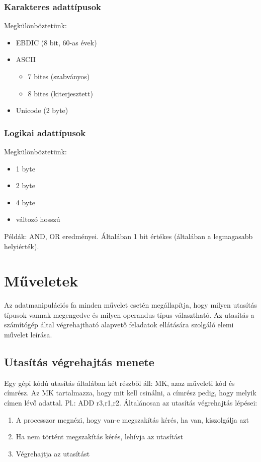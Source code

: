 \subsubsection{Karakteres adattípusok}
Megkülönböztetünk:
\begin{itemize}
    \item EBDIC (8 bit, 60-as évek)
    \item ASCII
    \begin{itemize}
        \item 7 bites (szabványos)
        \item 8 bites (kiterjesztett)
    \end{itemize}
    \item Unicode (2 byte)
\end{itemize}

\subsubsection{Logikai adattípusok}
Megkülönböztetünk:
\begin{itemize}
    \item 1 byte
    \item 2 byte
    \item 4 byte
    \item változó hosszú
\end{itemize}
Példák: AND, OR eredményei.
Általában 1 bit értékes (általában a legmagasabb helyiérték).

\section{Műveletek}
Az adatmanipulációs fa minden művelet esetén megállapítja, hogy milyen utasítás típusok vannak megengedve és milyen operandus típus választható.
Az utasítás a számítógép által végrehajtható alapvető feladatok ellátására szolgáló elemi művelet leírása.

\subsection{Utasítás végrehajtás menete}
Egy gépi kódú utasítás általában két részből áll: MK, azaz műveleti kód és címrész.
Az MK tartalmazza, hogy mit kell csinálni, a címrész pedig, hogy melyik címen lévő adattal.
Pl.: ADD r3,r1,r2.
Általánosan az utasítás végrehajtás lépései:
\begin{enumerate}
    \item A processzor megnézi, hogy van-e megszakítás kérés, ha van, kiszolgálja azt
    \item Ha nem történt megszakítás kérés, lehívja az utasítást
    \item Végrehajtja az utasítást
\end{enumerate}

